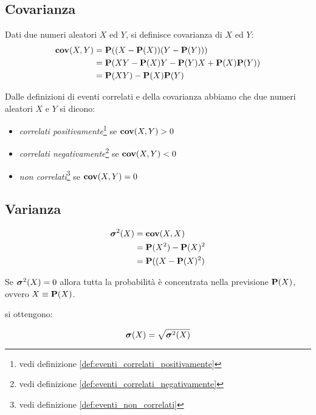 \subsection{Covarianza}
\begin{definition}[Covarianza]\label{def:covarianza}
  Dati due numeri aleatori $X$ ed $Y$, si definisce covarianza di $X$ ed $Y$:
  \begin{align*}
    \mathbf{cov}(X,Y) &= \mathbf{P}((X - \mathbf{P}(X))(Y - \mathbf{P}(Y))) \\
    &= \mathbf{P}(XY - \mathbf{P}(X)Y - \mathbf{P}(Y)X + \mathbf{P}(X)\mathbf{P}(Y)) \\
    &= \mathbf{P}(XY) - \mathbf{P}(X)\mathbf{P}(Y)
  \end{align*}
\end{definition}

\begin{proposition}
  Dalle definizioni di eventi correlati e della covarianza abbiamo che due numeri aleatori $X$ e $Y$ si dicono:
  \begin{itemize}
  \item \emph{correlati positivamente}\footnote{vedi definizione \ref{def:eventi_correlati_positivamente}} se \( \mathbf{cov}(X,Y) > 0 \)
  \item \emph{correlati negativamente}\footnote{vedi definizione \ref{def:eventi_correlati_negativamente}} se \( \mathbf{cov}(X,Y) < 0 \)
  \item \emph{non correlati}\footnote{vedi definizione \ref{def:eventi_non_correlati}} se \( \mathbf{cov}(X,Y) = 0 \)
  \end{itemize}
\end{proposition}


\subsection{Varianza}
\begin{definition}[Varianza]\label{def:varianza}
  \begin{align*}
    \boldsymbol\sigma^2(X) &= \mathbf{cov}(X,X) \\
    &= \mathbf{P}(X^2) - \mathbf{P}(X)^2 \\
    &= \mathbf{P}((X - \mathbf{P}(X)^2)
  \end{align*}
\end{definition}
Se \( \boldsymbol\sigma^2(X) = 0 \) allora tutta la probabilità è concentrata nella previsione \( \mathbf{P}(X) \), ovvero \( X \equiv \mathbf{P}(X) \).

 si ottengono:
\begin{definition}\label{def:scarto_quadratico_medio}
  \[ \boldsymbol\sigma(X) = \sqrt{\boldsymbol\sigma^2(X)} \]
\end{definition}

